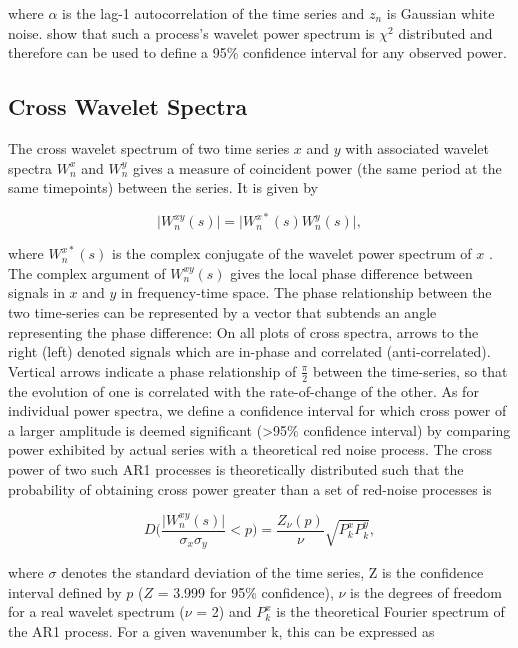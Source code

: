 where $\alpha$ is the lag-1 autocorrelation of the time series and $z_n$ is Gaussian white noise. \cite{Torrence1998} show that such a process's wavelet power spectrum is $\chi^2$ distributed and therefore can be used to define a 95\% confidence interval for any observed power. 

\subsection{Cross Wavelet Spectra}
The cross wavelet spectrum of two time series $x$ and $y$ with associated wavelet spectra $W^x_n$ and $W^y_n$ gives a measure of coincident power (the same period at the same timepoints) between the series. It is given by

\begin{equation} \label{wavelet_cross}
\vert W^{xy}_n(s)\vert = \vert W^{x*}_n(s) W^{y}_n(s)\vert,
\end{equation}

where $W^{x*}_n(s)$ is the complex conjugate of the wavelet power spectrum of $x$ \citep{grinstedApplication2004b}. The complex argument of $W^{xy}_n(s)$ gives the local phase difference between signals in $x$ and $y$ in frequency-time space. The phase relationship between the two time-series can be represented by a
vector that subtends an angle representing the phase difference: On all plots of cross spectra, arrows to the right (left) denoted signals which are in-phase and correlated (anti-correlated). Vertical arrows indicate a phase relationship of $\frac{\pi}{2}$ between the time-series, so that the evolution of
one is correlated with the rate-of-change of the other. As for individual power spectra, we define a confidence interval for which cross power of a larger amplitude is deemed significant (>95\% confidence interval) by comparing power exhibited by actual series with a theoretical red noise process. The cross power of two such AR1 processes is theoretically distributed such that the probability of obtaining cross power greater than a set of red-noise processes is

\begin{equation} \label{wavelet_cross_dist}
D\bigg(\frac{\vert W^{xy}_n(s)\vert}{\sigma_x \sigma_y} < p\bigg) = \frac{Z_\nu(p)}{\nu} \sqrt{P^x_k P^y_k},
\end{equation}

where $\sigma$ denotes the standard deviation of the time series, Z is the confidence interval defined by $p$ ($Z$ = 3.999 for 95\% confidence), $\nu$ is the degrees of freedom for a real wavelet spectrum ($\nu$ = 2) and $P^x_k$ is the theoretical Fourier spectrum of the AR1 process. For a given wavenumber k, this can be expressed as

